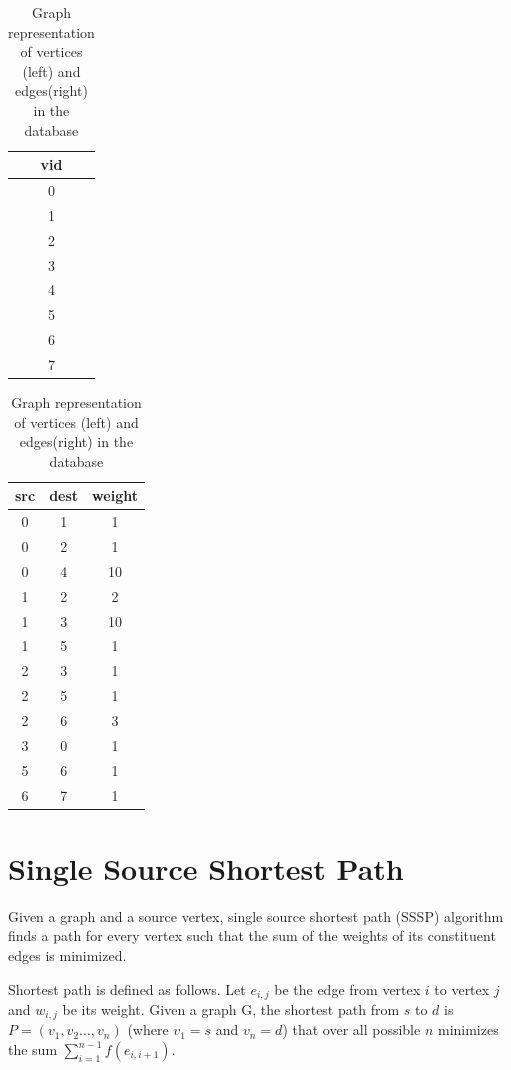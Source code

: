 \begin{table}
  \begin{tabular}{| c | }
    \hline
    vid \\ \hline
    0 \\ \hline
    1 \\ \hline
    2 \\ \hline
    3 \\ \hline
    4 \\ \hline
    5 \\ \hline
    6 \\ \hline
    7 \\
    \hline
  \end{tabular}
  \quad
  \begin{tabular}{| c | c | c |}
    \hline
    src & dest & weight \\ \hline
    0 & 1 & 1 \\ \hline
    0 & 2 & 1 \\ \hline
    0 & 4 & 10 \\ \hline
    1 & 2 & 2 \\ \hline
    1 & 3 & 10 \\ \hline
    1 & 5 & 1 \\ \hline
    2 & 3 & 1 \\ \hline
    2 & 5 & 1 \\ \hline
    2 & 6 & 3 \\ \hline
    3 & 0 & 1 \\ \hline
    5 & 6 & 1 \\ \hline
    6 & 7 & 1 \\
    \hline
  \end{tabular}
  \caption{Graph representation of vertices (left) and edges(right) in the
  database}
  \label{sssp:rep}
\end{table}


\section{Single Source Shortest Path} \label{sec:graph:sssp}

Given a graph and a source vertex, single source shortest path (SSSP)
algorithm finds a path for every vertex such that the sum of the weights of
its constituent edges is minimized.

Shortest path is defined as follows. Let $e_{i,j}$ be the edge from vertex $i$
to vertex $j$ and $w_{i,j}$ be its weight. Given a graph G, the shortest path
from $s$ to $d$ is $P = (v_1, v_2 \dots, v_n)$ (where $v_1=s$ and $v_n=d$)
that over all possible $n$ minimizes the sum $ \sum _{i=1}^{n-1}f(e_{i,i+1})$.

